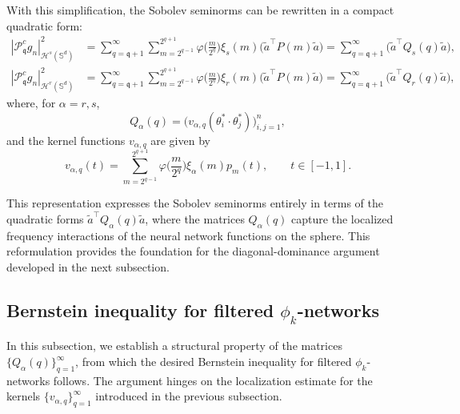 \documentclass{article}
\numberwithin{equation}{section}
\def\SS{\mathbb{S}}
\def\sul{\sum\limits}
\def\rr{ r}
\def\ss{ s}
\def\pc{\mathcal{P}^c}
\def\mq{\mathfrak{q}}
\begin{document}
\medskip
With this simplification, the Sobolev seminorms can be rewritten in a compact quadratic form:
\begin{equation}\label{eqn_sob_norm_s_r}
    \begin{split}
        |\pc_\mq g_n|_{\mathcal{H}^s(\SS^d)}^2
        &=\sul_{q=\mq+1}^\infty 
        \sul_{m=2^{q-1}}^{2^{q+1}}
        \varphi\big(\frac{m}{2^q}\big)\xi_\ss(m)
        \Big(\tilde{a}^\top P(m)\tilde{a}\Big)
        =\sul_{q=\mq+1}^\infty\Big(\tilde{a}^\top Q_\ss(q)\tilde{a}\Big),\\
        |\pc_\mq g_n|_{\mathcal{H}^r(\SS^d)}^2
        &=\sul_{q=\mq+1}^\infty 
        \sul_{m=2^{q-1}}^{2^{q+1}}
        \varphi\big(\frac{m}{2^q}\big)\xi_\rr(m)
        \Big(\tilde{a}^\top P(m)\tilde{a}\Big)
        =\sul_{q=\mq+1}^\infty\Big(\tilde{a}^\top Q_\rr(q)\tilde{a}\Big),
    \end{split}
\end{equation}
where, for $\alpha=\rr,\ss$,
\begin{equation}
    Q_\alpha(q)
    =\big(v_{\alpha,q}(\theta_i^*\cdot\theta_j^*)\big)_{i,j=1}^n,
\end{equation}
and the kernel functions $v_{\alpha,q}$ are given by
\begin{equation*}
    v_{\alpha,q}(t)
    =\sul_{m=2^{q-1}}^{2^{q+1}}
    \varphi\big(\frac{m}{2^q}\big)\xi_\alpha(m)p_m(t),
    \qquad t\in[-1,1].
\end{equation*}

\medskip
This representation expresses the Sobolev seminorms entirely in terms of the quadratic forms
$\tilde{a}^\top Q_\alpha(q)\tilde{a}$, 
where the matrices $Q_\alpha(q)$ capture the localized frequency interactions of the neural network functions on the sphere. 
This reformulation provides the foundation for the diagonal-dominance argument developed in the next subsection.



\subsection{Bernstein inequality for filtered $\phi_k$-networks}

In this subsection, we establish a structural property of the matrices $\{Q_\alpha(q)\}_{q=1}^\infty$, from which the desired Bernstein inequality for filtered $\phi_k$-networks follows.
The argument hinges on the localization estimate for the kernels $\{v_{\alpha,q}\}_{q=1}^\infty$ introduced in the previous subsection.
\end{document}

